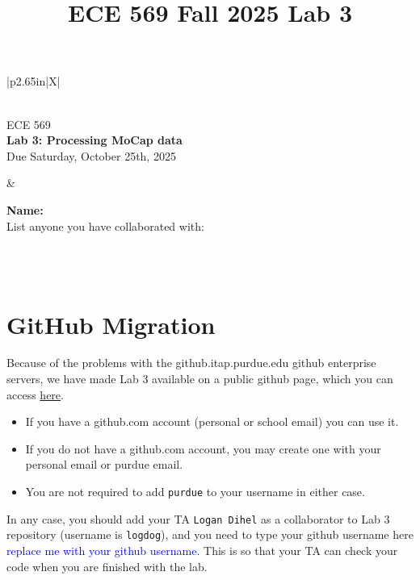 \documentclass{article}
\title{ECE 569 Fall 2025 Lab 3}
\numberwithin{figure}{section}
\begin{document}

\noindent
\begin{tabularx}{\linewidth}{|p{2.65in}|X|}
\hline
	\begin{minipage}{\linewidth}
	~\\
	
	{\Large ECE 569} \\
	{\bf Lab 3: Processing MoCap data} \\
	{Due Saturday, October 25th, 2025}	
	~\\
	\end{minipage}
	&
	\begin{minipage}{\linewidth}
	{\bf Name:} \vspace{0.5em} \\
	List anyone you have collaborated with:
	\\
	~\\	
	\end{minipage}
\\
\hline
\end{tabularx}

\section*{GitHub Migration}

Because of the problems with the github.itap.purdue.edu github enterprise servers, we have made Lab 3 available on a public github page, which you can access \href{https://github.com/purdue-ece569-fall2025/Lab3)}{here}.
\begin{itemize}
    \item If you have a github.com account (personal or school email) you can use it.
    \item If you do not have a github.com account, you may create one with your personal email or purdue email.
    \item You are not required to add \verb|purdue| to your username in either case.
\end{itemize}

In any case, you should add your TA \verb|Logan Dihel| as a collaborator to Lab 3 repository (username is \verb|logdog|), and you need to type your github username here \textcolor{blue}{replace me with your github username}. This is so that your TA can check your code when you are finished with the lab.
\end{document}
